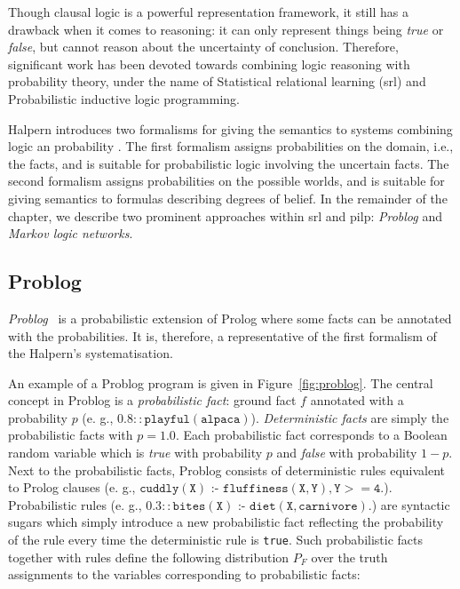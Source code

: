 Though clausal logic is a powerful representation framework, it still has a drawback when it comes to reasoning: it can only represent things being \textit{true} or \textit{false}, but cannot reason about the uncertainty of conclusion.
Therefore, significant work has been devoted towards combining logic reasoning with probability theory, under the name of Statistical relational learning (\gls{srl}) and Probabilistic inductive logic programming.




Halpern introduces two formalisms for giving the semantics to systems combining logic an probability \cite{Halpern90ananalysis}.
The first formalism assigns probabilities on the domain, i.e., the facts, and is suitable for probabilistic logic involving the uncertain facts.
The second formalism assigns probabilities on the possible worlds, and is suitable for giving semantics to formulas describing degrees of belief.
In the remainder of the chapter, we describe two prominent approaches within \gls{srl} and \gls{pilp}: \textit{Problog} and \textit{Markov logic networks}.


\subsection{Problog}

\textit{Problog}~\cite{DeRaedt:2007:PPP:1625275.1625673} is a probabilistic extension of Prolog where some facts can be annotated with the probabilities.
It is, therefore, a representative of the first formalism of the Halpern's systematisation.

An example of a Problog program is given in Figure~\ref{fig:problog}.
The central concept in Problog is a \textit{probabilistic fact}: ground fact $f$ annotated with a probability $p$ (e. g., $0.8{:: }{\mathtt {playful(alpaca)}}$).
\textit{Deterministic facts} are simply the probabilistic facts with $p = 1.0$.
Each probabilistic fact corresponds to a Boolean random variable which is \textit{true} with probability $p$ and \textit{false} with probability $1-p$.
Next to the probabilistic facts, Problog consists of deterministic rules equivalent to Prolog clauses (e. g., ${\mathtt {cuddly(X)} \text{ :- }{\mathtt {fluffiness(X,Y),Y >= 4}}.}$).
Probabilistic rules (e. g., $0.3{:: }{\mathtt {bites(X)}} \text{ :- }{\mathtt {diet(X,carnivore)}}.$) are syntactic sugars which simply introduce a new probabilistic fact reflecting the probability of the rule every time the deterministic rule is \texttt{true}.
Such probabilistic facts together with rules define the following distribution $P_{F}$ over the truth assignments to the variables corresponding to probabilistic facts:

